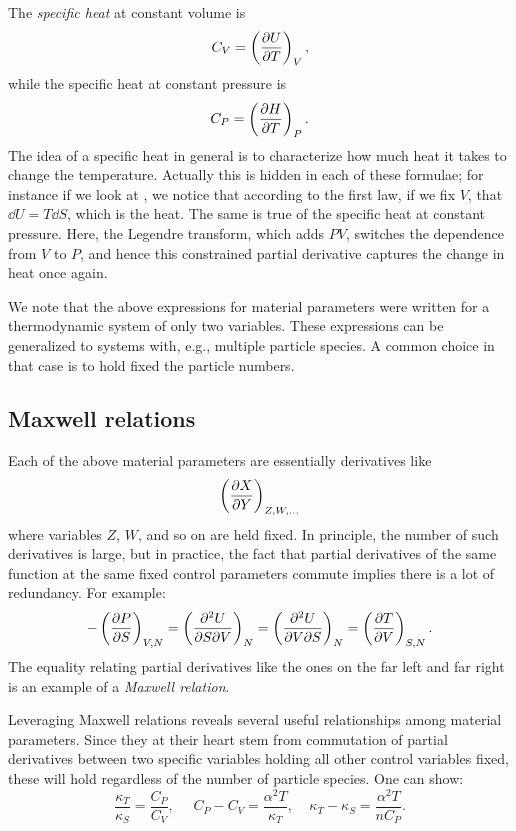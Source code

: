 The {\it specific heat} at constant volume is
\begin{equation}\label{eq:CV}
  C_V=\left(\pdv{U}{T}\right)_{V},
\end{equation}
while the specific heat at constant pressure is
\begin{equation}
  C_P=\left(\pdv{H}{T}\right)_{P}.
\end{equation}
The idea of a specific heat in general is to characterize how much heat
it takes to change the temperature. Actually this is hidden in each of
these formulae; for instance if we look at , we notice
that according to the first law, if we fix $V$, that
$\dd U=T\dd{S}$, which is the heat. The same is true of the specific heat
at constant pressure. Here, the Legendre transform, which adds $PV$,
switches the dependence from $V$ to $P$, and hence this constrained
partial derivative captures the change in heat once again.

We note that the above expressions for material parameters were
written for a thermodynamic system of only two variables. These expressions
can be generalized to systems with, e.g., multiple particle species.
A common choice in that case is to hold fixed the particle numbers.


\subsection{Maxwell relations}

Each of the above material parameters are essentially derivatives like
\begin{equation}
\left(\pdv{X}{Y}\right)_{Z,W,...}
\end{equation}
where variables $Z$, $W$, and so on are held fixed. In principle, the
number of such derivatives is large, but in practice, the fact
that partial derivatives of the same function at the same fixed
control parameters commute implies there is a lot of redundancy. 
For example:
\begin{equation}
-\left(\pdv{P}{S}\right)_{V,N}
=\left(\frac{\partial^2 U}{\partial S\partial V}\right)_{N}
=\left(\frac{\partial^2 U}{\partial V\partial S}\right)_{N}
=\left(\pdv{T}{V}\right)_{S,N}.
\end{equation}
The equality relating partial derivatives like the ones on the far left
and far right is an example of a {\it Maxwell relation}.

Leveraging Maxwell relations reveals several useful relationships
among material parameters. Since they at their heart stem from
commutation of partial derivatives between two specific variables holding
all other control variables fixed, these will hold regardless of
the number of particle species. One can show:
\begin{equation}\label{eq:matparamconstraints}
 \frac{\kappa_T}{\kappa_S}=\frac{C_P}{C_V},~~~~~~ C_P-C_V=\frac{\alpha^2
T}{\kappa_T}, ~~~~~
 \kappa_T-\kappa_S=\frac{\alpha^2 T}{n C_P}.
\end{equation}

